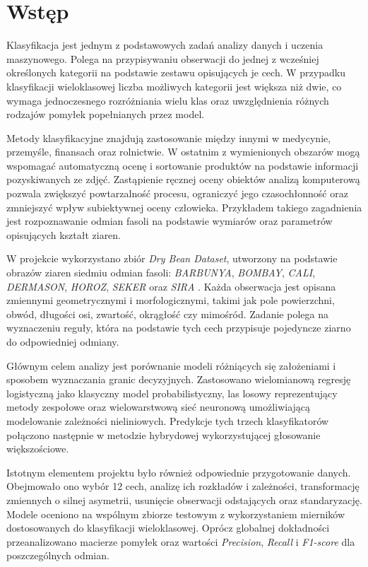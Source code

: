 \documentclass{report}
\begin{document}
\chapter{Wstęp}

Klasyfikacja jest jednym z podstawowych zadań analizy danych i uczenia maszynowego. Polega na przypisywaniu obserwacji do jednej z wcześniej określonych kategorii na podstawie zestawu opisujących je cech. W przypadku klasyfikacji wieloklasowej liczba możliwych kategorii jest większa niż dwie, co wymaga jednoczesnego rozróżniania wielu klas oraz uwzględnienia różnych rodzajów pomyłek popełnianych przez model.

Metody klasyfikacyjne znajdują zastosowanie między innymi w medycynie, przemyśle, finansach oraz rolnictwie. W ostatnim z wymienionych obszarów mogą wspomagać automatyczną ocenę i sortowanie produktów na podstawie informacji pozyskiwanych ze zdjęć. Zastąpienie ręcznej oceny obiektów analizą komputerową pozwala zwiększyć powtarzalność procesu, ograniczyć jego czasochłonność oraz zmniejszyć wpływ subiektywnej oceny człowieka. Przykładem takiego zagadnienia jest rozpoznawanie odmian fasoli na podstawie wymiarów oraz parametrów opisujących kształt ziaren.

W projekcie wykorzystano zbiór \textit{Dry Bean Dataset}, utworzony na podstawie obrazów ziaren siedmiu odmian fasoli: \textit{BARBUNYA}, \textit{BOMBAY}, \textit{CALI}, \textit{DERMASON}, \textit{HOROZ}, \textit{SEKER} oraz \textit{SIRA} \cite{koklu2020}. Każda obserwacja jest opisana zmiennymi geometrycznymi i morfologicznymi, takimi jak pole powierzchni, obwód, długości osi, zwartość, okrągłość czy mimośród. Zadanie polega na wyznaczeniu reguły, która na podstawie tych cech przypisuje pojedyncze ziarno do odpowiedniej odmiany.

Głównym celem analizy jest porównanie modeli różniących się założeniami i sposobem wyznaczania granic decyzyjnych. Zastosowano wielomianową regresję logistyczną jako klasyczny model probabilistyczny, las losowy reprezentujący metody zespołowe oraz wielowarstwową sieć neuronową umożliwiającą modelowanie zależności nieliniowych. Predykcje tych trzech klasyfikatorów połączono następnie w metodzie hybrydowej wykorzystującej głosowanie większościowe.

Istotnym elementem projektu było również odpowiednie przygotowanie danych. Obejmowało ono wybór 12 cech, analizę ich rozkładów i zależności, transformację zmiennych o silnej asymetrii, usunięcie obserwacji odstających oraz standaryzację. Modele oceniono na wspólnym zbiorze testowym z wykorzystaniem mierników dostosowanych do klasyfikacji wieloklasowej. Oprócz globalnej dokładności przeanalizowano macierze pomyłek oraz wartości \textit{Precision}, \textit{Recall} i \textit{F1-score} dla poszczególnych odmian.
\end{document}
